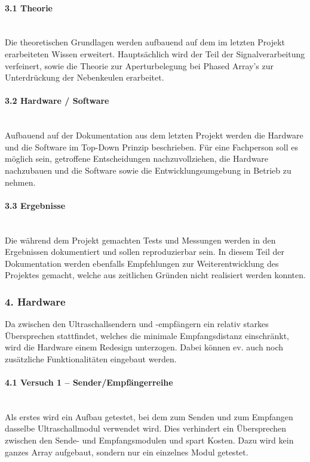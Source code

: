 \documentclass[10pt,a4paper,oneside]{99_fhnwreport}
\begin{document}
\paragraph{3.1 Theorie}\\
Die theoretischen Grundlagen werden aufbauend auf dem im letzten Projekt erarbeiteten Wissen erweitert. Hauptsächlich wird der Teil der Signalverarbeitung verfeinert, sowie die Theorie zur Aperturbelegung bei Phased Array's zur Unterdrückung der Nebenkeulen erarbeitet.

\paragraph{3.2 Hardware / Software}\\
Aufbauend auf der Dokumentation aus dem letzten Projekt werden die Hardware und die Software im Top-Down Prinzip beschrieben. Für eine Fachperson soll es möglich sein, getroffene Entscheidungen nachzuvollziehen, die Hardware nachzubauen und die Software sowie die Entwicklungsumgebung in Betrieb zu nehmen.

\paragraph{3.3 Ergebnisse}\\
Die während dem Projekt gemachten Tests und Messungen werden in den Ergebnissen dokumentiert und sollen reproduzierbar sein.
In diesem Teil der Dokumentation werden ebenfalls Empfehlungen zur Weiterentwicklung des Projektes gemacht, welche aus zeitlichen Gründen nicht realisiert werden konnten.


\subsubsection*{4. Hardware}
Da zwischen den Ultraschallsendern und -empfängern ein relativ starkes Übersprechen stattfindet, welches die minimale Empfangsdistanz einschränkt, wird die Hardware einem Redesign unterzogen. Dabei können ev. auch noch zusätzliche Funktionalitäten eingebaut werden.

\paragraph{4.1 Versuch 1 -- Sender/Empfängerreihe}\\
Als erstes wird ein Aufbau getestet, bei dem zum Senden und zum Empfangen dasselbe Ultraschallmodul verwendet wird. Dies verhindert ein Übersprechen zwischen den Sende- und Empfangsmodulen und spart Kosten. Dazu wird kein ganzes Array aufgebaut, sondern nur ein einzelnes Modul getestet.
\end{document}
